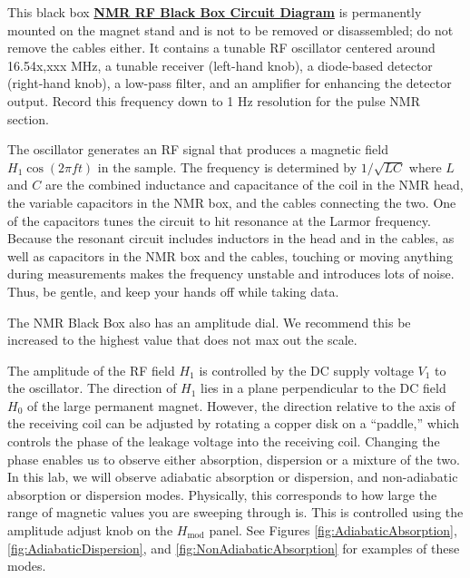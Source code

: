 \documentclass{../lab}
\begin{document}
This black box \href{https://berkeley-physics111b.github.io/assets/pdf/oldwebsitestructure/images/NMR31.gif}{\textbf{NMR RF Black Box Circuit Diagram}}
is permanently mounted on the magnet stand and is not to be removed or disassembled; do not remove the cables either. It contains a tunable RF oscillator centered around 16.54x,xxx MHz, a tunable receiver (left-hand knob), a diode-based detector (right-hand knob), a low-pass filter, and an amplifier for enhancing the detector output. Record this frequency down to 1 Hz resolution for the pulse NMR section.

The oscillator generates an RF signal that produces a magnetic field $H_1\cos(2\pi f t)$ in the sample. The frequency is determined by $1/\sqrt{LC}$ where $L$ and $C$ are the combined inductance and capacitance of the coil in the NMR head, the variable capacitors in the NMR box, and the cables connecting the two. One of the capacitors tunes the circuit to hit resonance at the Larmor frequency. Because the resonant circuit includes inductors in the head and in the cables, as well as capacitors in the NMR box and the cables, touching or moving anything during measurements makes the frequency unstable and introduces lots of noise. Thus, be gentle, and keep your hands off while taking data.

The NMR Black Box also has an amplitude dial. We recommend this be increased to the highest value that does not max out the scale.

The amplitude of the RF field $H_1$ is controlled by the DC supply voltage $V_1$ to the oscillator. The direction of $H_1$ lies in a plane perpendicular to the DC field $H_0$ of the large permanent magnet. However, the direction relative to the axis of the receiving coil can be adjusted by rotating a copper disk on a ``paddle,'' which controls the phase of the leakage voltage into the receiving coil. Changing the phase enables us to observe either absorption, dispersion or a mixture of the two. In this lab, we will observe adiabatic absorption or dispersion, and non-adiabatic absorption or dispersion modes. Physically, this corresponds to how large the range of magnetic values you are sweeping through is. This is controlled using the amplitude adjust knob on the $H_\text{mod}$ panel. See Figures \ref{fig:AdiabaticAbsorption}, \ref{fig:AdiabaticDispersion}, and \ref{fig:NonAdiabaticAbsorption} for examples of these modes.
\end{document}
